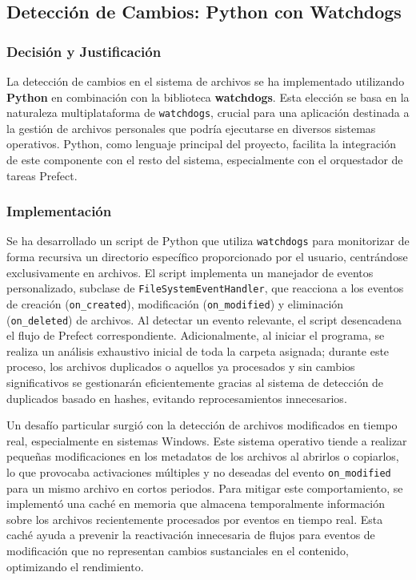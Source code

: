 \subsection{Detección de Cambios: Python con Watchdogs}
\label{subsec:decision_watchdogs}
\subsubsection{Decisión y Justificación}
La detección de cambios en el sistema de archivos se ha implementado utilizando \textbf{Python} en combinación con la biblioteca \textbf{watchdogs}. Esta elección se basa en la naturaleza multiplataforma de \texttt{watchdogs}, crucial para una aplicación destinada a la gestión de archivos personales que podría ejecutarse en diversos sistemas operativos. Python, como lenguaje principal del proyecto, facilita la integración de este componente con el resto del sistema, especialmente con el orquestador de tareas Prefect.

\subsubsection{Implementación}
Se ha desarrollado un script de Python que utiliza \texttt{watchdogs} para monitorizar de forma recursiva un directorio específico proporcionado por el usuario, centrándose exclusivamente en archivos. El script implementa un manejador de eventos personalizado, subclase de \texttt{FileSystemEventHandler}, que reacciona a los eventos de creación (\texttt{on\_created}), modificación (\texttt{on\_modified}) y eliminación (\texttt{on\_deleted}) de archivos. Al detectar un evento relevante, el script desencadena el flujo de Prefect correspondiente. Adicionalmente, al iniciar el programa, se realiza un análisis exhaustivo inicial de toda la carpeta asignada; durante este proceso, los archivos duplicados o aquellos ya procesados y sin cambios significativos se gestionarán eficientemente gracias al sistema de detección de duplicados basado en hashes, evitando reprocesamientos innecesarios.

Un desafío particular surgió con la detección de archivos modificados en tiempo real, especialmente en sistemas Windows. Este sistema operativo tiende a realizar pequeñas modificaciones en los metadatos de los archivos al abrirlos o copiarlos, lo que provocaba activaciones múltiples y no deseadas del evento \texttt{on\_modified} para un mismo archivo en cortos periodos. Para mitigar este comportamiento, se implementó una caché en memoria que almacena temporalmente información sobre los archivos recientemente procesados por eventos en tiempo real. Esta caché ayuda a prevenir la reactivación innecesaria de flujos para eventos de modificación que no representan cambios sustanciales en el contenido, optimizando el rendimiento.

